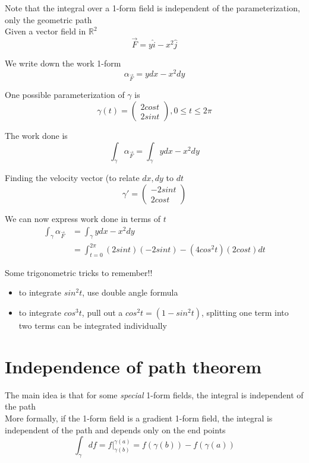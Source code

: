 Note that the integral over a 1-form field is independent of the parameterization, only the geometric path \\

Given a vector field in $ \mathbb{R}^2$ 
\[
  \vec{F} = y \hat{i} - x^2 \hat{j}
\] 

We write down the work 1-form
\[
   \alpha_{ \vec{F}} = ydx - x^2 dy
\]  

One possible parameterization of $\gamma$ is
\[
  \gamma(t) = \begin{pmatrix} 2 cos t \\ 2 sin t  \end{pmatrix}, 0 \leq t \leq 2\pi
\] 

The work done is 
\[
   \int_{\gamma} \alpha_{ \vec{F}} = \int_{\gamma } y dx - x^2 dy
\] 

Finding the velocity vector (to relate $dx, dy$ to $dt$
 \[
  \gamma ' = \begin{pmatrix} -2sint \\ 2 cost \end{pmatrix} 
\] 

We can now express work done in terms of $t$ 
\begin{align*}
   \int_{\gamma} \alpha_{ \vec{F}} &= \int_{\gamma } y dx - x^2 dy \\
                                   &= \int_{t = 0}^{2 \pi} (2 sint ) (-2sint) - (4cos^2 t) (2 cost) dt 
\end{align*}

Some trigonometric tricks to remember!!
\begin{itemize}
   \item to integrate $sin^2 t$, use double angle formula
   \item to integrate  $cos^3 t$, pull out a $cos^2 t = (1 - sin^2 t)$, splitting one term into two terms can be integrated individually
\end{itemize}

\section{Independence of path theorem}

The main idea is that for some \textit{special} 1-form fields, the integral is independent of the path \\

More formally, if the 1-form field is a gradient 1-form field, the integral is independent of the path and depends only on the end points
\[
   \int_{\gamma} df = \left. f \right|_{ \gamma(b)}^{\gamma(a)}  = f( \gamma(b)) - f( \gamma(a))
\] 

